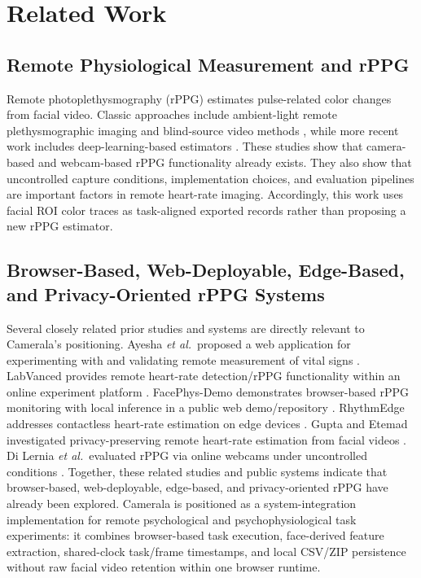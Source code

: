 \documentclass[dvipdfmx]{ehis}
\newcommand{\etal}{\textit{et al.}}
\begin{document}
\section{Related Work}

\subsection{Remote Physiological Measurement and rPPG}
Remote photoplethysmography (rPPG) estimates pulse-related color changes from facial video.
Classic approaches include ambient-light remote plethysmographic imaging and blind-source video methods \cite{verkruysse2008,poh_ica}, while more recent work includes deep-learning-based estimators \cite{deepphys}.
These studies show that camera-based and webcam-based rPPG functionality already exists.
They also show that uncontrolled capture conditions, implementation choices, and evaluation pipelines are important factors in remote heart-rate imaging.
Accordingly, this work uses facial ROI color traces as task-aligned exported records rather than proposing a new rPPG estimator.

\subsection{Browser-Based, Web-Deployable, Edge-Based, and Privacy-Oriented rPPG Systems}
Several closely related prior studies and systems are directly relevant to Camerala's positioning.
Ayesha \etal\ proposed a web application for experimenting with and validating remote measurement of vital signs \cite{ayesha_web_vital}.
LabVanced provides remote heart-rate detection/rPPG functionality within an online experiment platform \cite{labvanced_rppg}.
FacePhys-Demo demonstrates browser-based rPPG monitoring with local inference in a public web demo/repository \cite{facephys_demo}.
RhythmEdge addresses contactless heart-rate estimation on edge devices \cite{rhythmedge}.
Gupta and Etemad investigated privacy-preserving remote heart-rate estimation from facial videos \cite{gupta_privacy}.
Di Lernia \etal\ evaluated rPPG via online webcams under uncontrolled conditions \cite{di_lernia_rppg_wild}.
Together, these related studies and public systems indicate that browser-based, web-deployable, edge-based, and privacy-oriented rPPG have already been explored.
Camerala is positioned as a system-integration implementation for remote psychological and psychophysiological task experiments: it combines browser-based task execution, face-derived feature extraction, shared-clock task/frame timestamps, and local CSV/ZIP persistence without raw facial video retention within one browser runtime.
\end{document}
